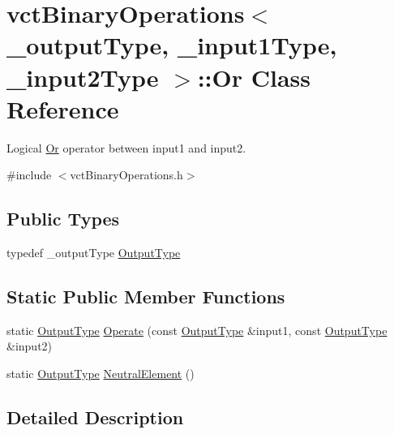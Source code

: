 \hypertarget{classvct_binary_operations_1_1_or}{\section{vct\-Binary\-Operations$<$ \-\_\-output\-Type, \-\_\-input1\-Type, \-\_\-input2\-Type $>$\-:\-:Or Class Reference}
\label{classvct_binary_operations_1_1_or}
}


Logical \hyperlink{classvct_binary_operations_1_1_or}{Or} operator between input1 and input2.  




{\ttfamily \#include $<$vct\-Binary\-Operations.\-h$>$}

\subsection*{Public Types}
\begin{DoxyCompactItemize}
\item 
typedef \-\_\-output\-Type \hyperlink{classvct_binary_operations_1_1_or_a5401f56c720be18225261374125626f9}{Output\-Type}
\end{DoxyCompactItemize}
\subsection*{Static Public Member Functions}
\begin{DoxyCompactItemize}
\item 
static \hyperlink{classvct_binary_operations_1_1_or_a5401f56c720be18225261374125626f9}{Output\-Type} \hyperlink{classvct_binary_operations_1_1_or_a300ac74f6b8d4779339cc0766836fe55}{Operate} (const \hyperlink{classvct_binary_operations_1_1_or_a5401f56c720be18225261374125626f9}{Output\-Type} \&input1, const \hyperlink{classvct_binary_operations_1_1_or_a5401f56c720be18225261374125626f9}{Output\-Type} \&input2)
\item 
static \hyperlink{classvct_binary_operations_1_1_or_a5401f56c720be18225261374125626f9}{Output\-Type} \hyperlink{classvct_binary_operations_1_1_or_aa5370d181a9602330e386316eaa0d869}{Neutral\-Element} ()
\end{DoxyCompactItemize}


\subsection{Detailed Description}
